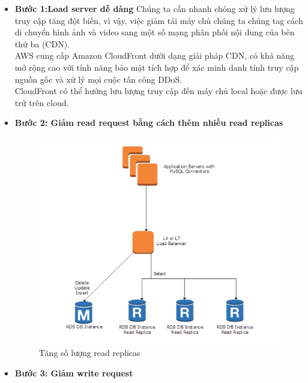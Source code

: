 \begin{itemize}
    \item \textbf{Bước 1:Load server dễ dàng}
        \newline
        Chúng ta cần nhanh chóng xử lý lưu lượng truy cập tăng đột biến, vì vậy, việc giảm tải máy chủ chúng ta chúng tag cách di chuyển hình ảnh và video sang một số mạng phân phối nội dung của bên thứ ba (CDN). \\[0.5cm]
        AWS cung cấp Amazon CloudFront dưới dạng giải pháp CDN, có khả năng mở rộng cao với tính năng bảo mật tích hợp để xác minh danh tính truy cập nguồn gốc và xử lý mọi cuộc tấn công DDoS. \\[0.5cm]
        CloudFront có thể hướng lưu lượng truy cập đến máy chủ local hoặc được lưu trữ trên cloud.
    \item \textbf{Bước 2: Giảm read request bằng cách thêm nhiều read replicas}
        \begin{figure}[H]
            \begin{center}
            \includegraphics[scale=1]{images/hieu/chap-2/read-replica.png}
            \vspace*{5mm}
            \caption{Tăng số lượng read replicas}
            \end{center}
        \end{figure} 
    \item \textbf{Bước 3: Giảm write request}
        \begin{figure}[H]
            \begin{center}

\end{center}
\end{figure}
\end{itemize}
